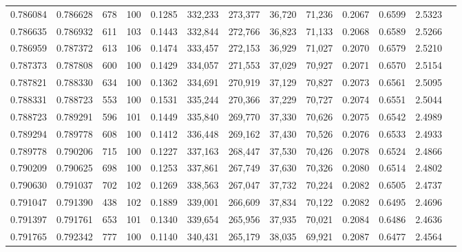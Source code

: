 \begin{tabular}{rrrrrrrrrrrrr}
0.786084 & 0.786628 &   678 & 100 &                                     0.1285 & 332,233 & 273,377 &  36,720 &  71,236 & 0.2067 & 0.6599 & 2.5323 \\
0.786635 & 0.786932 &   611 & 103 &                                     0.1443 & 332,844 & 272,766 &  36,823 &  71,133 & 0.2068 & 0.6589 & 2.5266 \\
0.786959 & 0.787372 &   613 & 106 &                                     0.1474 & 333,457 & 272,153 &  36,929 &  71,027 & 0.2070 & 0.6579 & 2.5210 \\
0.787373 & 0.787808 &   600 & 100 &                                     0.1429 & 334,057 & 271,553 &  37,029 &  70,927 & 0.2071 & 0.6570 & 2.5154 \\
0.787821 & 0.788330 &   634 & 100 &                                     0.1362 & 334,691 & 270,919 &  37,129 &  70,827 & 0.2073 & 0.6561 & 2.5095 \\
0.788331 & 0.788723 &   553 & 100 &                                     0.1531 & 335,244 & 270,366 &  37,229 &  70,727 & 0.2074 & 0.6551 & 2.5044 \\
0.788723 & 0.789291 &   596 & 101 &                                     0.1449 & 335,840 & 269,770 &  37,330 &  70,626 & 0.2075 & 0.6542 & 2.4989 \\
0.789294 & 0.789778 &   608 & 100 &                                     0.1412 & 336,448 & 269,162 &  37,430 &  70,526 & 0.2076 & 0.6533 & 2.4933 \\
0.789778 & 0.790206 &   715 & 100 &                                     0.1227 & 337,163 & 268,447 &  37,530 &  70,426 & 0.2078 & 0.6524 & 2.4866 \\
0.790209 & 0.790625 &   698 & 100 &                                     0.1253 & 337,861 & 267,749 &  37,630 &  70,326 & 0.2080 & 0.6514 & 2.4802 \\
0.790630 & 0.791037 &   702 & 102 &                                     0.1269 & 338,563 & 267,047 &  37,732 &  70,224 & 0.2082 & 0.6505 & 2.4737 \\
0.791047 & 0.791390 &   438 & 102 &                                     0.1889 & 339,001 & 266,609 &  37,834 &  70,122 & 0.2082 & 0.6495 & 2.4696 \\
0.791397 & 0.791761 &   653 & 101 &                                     0.1340 & 339,654 & 265,956 &  37,935 &  70,021 & 0.2084 & 0.6486 & 2.4636 \\
0.791765 & 0.792342 &   777 & 100 &                                     0.1140 & 340,431 & 265,179 &  38,035 &  69,921 & 0.2087 & 0.6477 & 2.4564 \\

\end{tabular}
